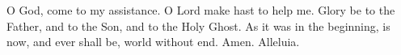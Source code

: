 
\rubric{\Vbar}O God, come to my assistance. O Lord make hast to help me. Glory be to the Father, and to the Son, \rubric{\GreStar} and to the Holy Ghost. As it was in the beginning, is now, \rubric{\GreStar} and ever shall be, world without end. Amen. Alleluia.
